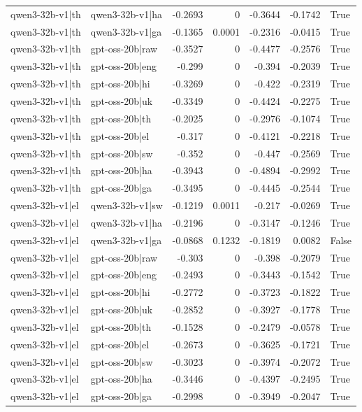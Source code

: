 \begin{table}
\begin{tabular}{l l r r r r l}
qwen3-32b-v1|th & qwen3-32b-v1|ha & -0.2693 & 0 & -0.3644 & -0.1742 & True \\
qwen3-32b-v1|th & qwen3-32b-v1|ga & -0.1365 & 0.0001 & -0.2316 & -0.0415 & True \\
qwen3-32b-v1|th & gpt-oss-20b|raw & -0.3527 & 0 & -0.4477 & -0.2576 & True \\
qwen3-32b-v1|th & gpt-oss-20b|eng & -0.299 & 0 & -0.394 & -0.2039 & True \\
qwen3-32b-v1|th & gpt-oss-20b|hi & -0.3269 & 0 & -0.422 & -0.2319 & True \\
qwen3-32b-v1|th & gpt-oss-20b|uk & -0.3349 & 0 & -0.4424 & -0.2275 & True \\
qwen3-32b-v1|th & gpt-oss-20b|th & -0.2025 & 0 & -0.2976 & -0.1074 & True \\
qwen3-32b-v1|th & gpt-oss-20b|el & -0.317 & 0 & -0.4121 & -0.2218 & True \\
qwen3-32b-v1|th & gpt-oss-20b|sw & -0.352 & 0 & -0.447 & -0.2569 & True \\
qwen3-32b-v1|th & gpt-oss-20b|ha & -0.3943 & 0 & -0.4894 & -0.2992 & True \\
qwen3-32b-v1|th & gpt-oss-20b|ga & -0.3495 & 0 & -0.4445 & -0.2544 & True \\
qwen3-32b-v1|el & qwen3-32b-v1|sw & -0.1219 & 0.0011 & -0.217 & -0.0269 & True \\
qwen3-32b-v1|el & qwen3-32b-v1|ha & -0.2196 & 0 & -0.3147 & -0.1246 & True \\
qwen3-32b-v1|el & qwen3-32b-v1|ga & -0.0868 & 0.1232 & -0.1819 & 0.0082 & False \\
qwen3-32b-v1|el & gpt-oss-20b|raw & -0.303 & 0 & -0.398 & -0.2079 & True \\
qwen3-32b-v1|el & gpt-oss-20b|eng & -0.2493 & 0 & -0.3443 & -0.1542 & True \\
qwen3-32b-v1|el & gpt-oss-20b|hi & -0.2772 & 0 & -0.3723 & -0.1822 & True \\
qwen3-32b-v1|el & gpt-oss-20b|uk & -0.2852 & 0 & -0.3927 & -0.1778 & True \\
qwen3-32b-v1|el & gpt-oss-20b|th & -0.1528 & 0 & -0.2479 & -0.0578 & True \\
qwen3-32b-v1|el & gpt-oss-20b|el & -0.2673 & 0 & -0.3625 & -0.1721 & True \\
qwen3-32b-v1|el & gpt-oss-20b|sw & -0.3023 & 0 & -0.3974 & -0.2072 & True \\
qwen3-32b-v1|el & gpt-oss-20b|ha & -0.3446 & 0 & -0.4397 & -0.2495 & True \\
qwen3-32b-v1|el & gpt-oss-20b|ga & -0.2998 & 0 & -0.3949 & -0.2047 & True \\

\end{tabular}
\end{table}
